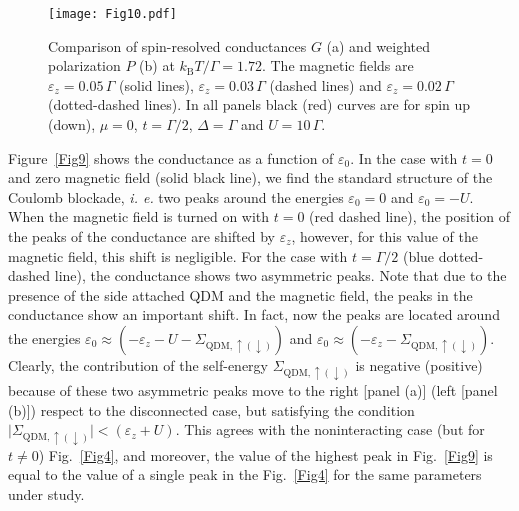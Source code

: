 \documentclass[aps,twocolumn,prb,superscript,floatfix,superscriptaddress,showpacs]{revtex4-1}
\newcommand{\ve}{\varepsilon}
\begin{document}
\begin{figure}[tbph]
\centering
\texttt{[image: Fig10.pdf]}
\caption{Comparison of spin-resolved conductances $G$ (a) and weighted polarization $P$ (b) at $k_{\text{B}}T/\Gamma=1.72$. The magnetic fields are $\ve_{z}=0.05\,\Gamma$ (solid lines), $\ve_{z}=0.03\,\Gamma$ (dashed lines) and $\ve_{z}=0.02\,\Gamma$ (dotted-dashed lines). In all panels black (red) curves are for spin up (down), $\mu=0$, $t=\Gamma/2$, $\Delta=\Gamma$ and $U=10\,\Gamma$.}

\label{Fig10}
\end{figure}

Figure\ \ref{Fig9} shows the conductance as a function of $\varepsilon_0$. In the case with $t=0$ and zero magnetic field (solid black line), we find the standard structure of the Coulomb blockade, \emph{i. e.} two peaks around the energies $\ve_{0}=0$ and $\ve_{0}=-U$. When the magnetic field is turned on with $t=0$ (red dashed line), the position of the peaks of the conductance are shifted by $\ve_{z}$, however, for this value of the magnetic field, this shift is negligible. For the case with $t=\Gamma/2$  (blue dotted-dashed line), the conductance shows two asymmetric peaks. Note that due to the presence of the side attached QDM and the magnetic field, the peaks in the conductance show an important shift. In fact, now the peaks are located around the energies $\ve_{0}\approx (-\ve_{z}-U-\Sigma_{\text{QDM},\uparrow (\downarrow)})$ and $\ve_{0}\approx (-\ve_{z}-\Sigma_{\text{QDM},\uparrow (\downarrow)})$. Clearly, the contribution of the self-energy $\Sigma_{\text{QDM},\uparrow(\downarrow)}$ is negative (positive) because of these two asymmetric peaks move to the right [panel (a)] (left [panel (b)]) respect to the disconnected case, but satisfying the condition $\mid\Sigma_{\text{QDM},\uparrow (\downarrow) }\mid<(\ve_{z}+U)$. This agrees with the noninteracting case (but for $t\neq0$) Fig.\ \ref{Fig4}, and moreover, the value of the highest peak in Fig.\ \ref{Fig9} is equal to the value of a single peak in the Fig.\ \ref{Fig4} for the same parameters under study.
\end{document}
